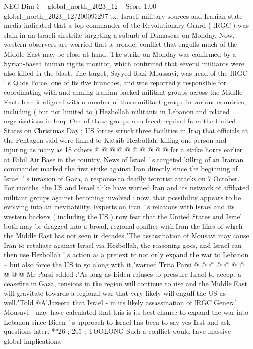 \begin{textsample}{NEG Dim 3 – global\_north\_2023\_12 – Score 1.00 – global\_north\_2023\_12/200093297.txt}  \label{ex:f3_neg_197}
Israeli military sources and Iranian state media indicated that a top commander of the Revolutionary Guard ( IRGC ) was slain in an Israeli airstrike targeting a suburb of Damascus on Monday.
Now, western observers are worried that a broader conflict that engulfs much of the Middle East may be close at hand.
The strike on Monday was confirmed by a Syrian-based human rights monitor, which confirmed that several militants were also killed in the blast.
The target, Sayyed Razi Moussavi, was head of the IRGC ' s Quds Force, one of its five branches, and was reportedly responsible for coordinating with and arming Iranian-backed militant groups across the Middle East.
Iran is aligned with a number of these militant groups in various countries, including ( but not limited to ) Hezbollah militants in Lebanon and related organisations in Iraq.
One of those groups also faced reprisal from the United States on Christmas Day ; US forces struck three facilities in Iraq that officials at the Pentagon said were linked to Kataib Hezbollah, killing one person and injuring as many as 18 others @ @ @ @ @ @ @ @ @ @ for a strike hours earlier at Erbil Air Base in the country.
News of Israel ' s targeted killing of an Iranian commander marked the first strike against Iran directly since the beginning of Israel ' s invasion of Gaza, a response to deadly terrorist attacks on 7 October.
For months, the US and Israel alike have warned Iran and its network of affiliated militant groups against becoming involved ; now, that possibility appears to be evolving into an inevitability.
Experts on Iran ' s relations with Israel and its western backers ( including the US ) now fear that the United States and Israel both may be dragged into a broad, regional conflict with Iran the likes of which the Middle East has not seen in decades."The assassination of Mousavi may cause Iran to retaliate against Israel via Hezbollah, the reasoning goes, and Israel can then use Hezbollah ' s action as a pretext to not only expand the war to Lebanon -- but also force the US to go along with it,"warned Trita Parsi @ @ @ @ @ @ @ @ @ @ Mr Parsi added :"As long as Biden refuses to pressure Israel to accept a ceasefire in Gaza, tensions in the region will continue to rise and the Middle East will gravitate towards a regional war that very likely will engulf the US as well."Told @AlJazeera that Israel - in its likely assassination of IRGC General Mousavi - may have calculated that this is its best chance to expand the war into Lebanon since Biden ' s approach to Israel has been to say yes first and ask questions later. **26 ; 205 ; TOOLONG Such a conflict would have massive global implications.

\end{textsample}
